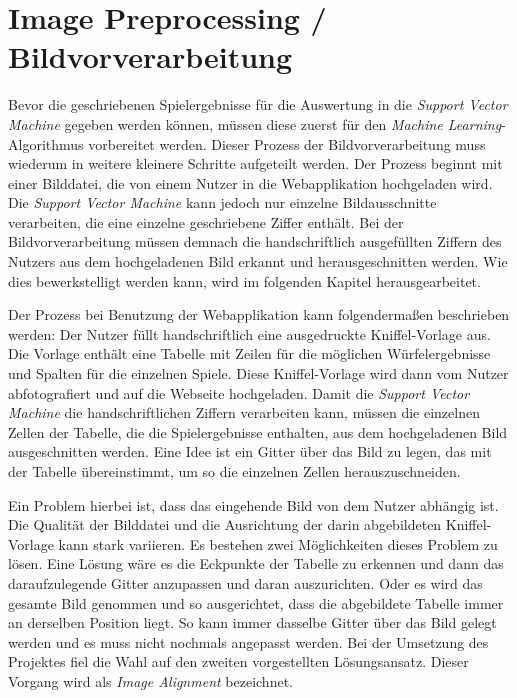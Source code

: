 \section{Image Preprocessing / Bildvorverarbeitung} \label{sec:imagepreprocessing}
Bevor die geschriebenen Spielergebnisse für die Auswertung in die \textit{Support Vector Machine} gegeben werden können, müssen diese zuerst
für den \textit{Machine Learning}-Algorithmus vorbereitet werden. Dieser Prozess der Bildvorverarbeitung muss wiederum in weitere kleinere
Schritte aufgeteilt werden. Der Prozess beginnt mit einer Bilddatei, die von einem Nutzer in die Webapplikation hochgeladen wird. 
Die \textit{Support Vector Machine} kann jedoch nur einzelne Bildausschnitte verarbeiten, die eine einzelne geschriebene Ziffer enthält.
Bei der Bildvorverarbeitung müssen demnach die handschriftlich ausgefüllten Ziffern des Nutzers aus dem hochgeladenen Bild erkannt und
herausgeschnitten werden. Wie dies bewerkstelligt werden kann, wird im folgenden Kapitel herausgearbeitet.

Der Prozess bei Benutzung der Webapplikation kann folgendermaßen beschrieben werden: Der Nutzer füllt handschriftlich eine ausgedruckte Kniffel-Vorlage aus.
Die Vorlage enthält eine Tabelle mit Zeilen für die möglichen Würfelergebnisse und Spalten für die einzelnen Spiele. Diese Kniffel-Vorlage 
wird dann vom Nutzer abfotografiert und auf die Webseite hochgeladen. Damit die \textit{Support Vector Machine} die handschriftlichen Ziffern verarbeiten kann,
müssen die einzelnen Zellen der Tabelle, die die Spielergebnisse enthalten, aus dem hochgeladenen Bild ausgeschnitten werden. Eine Idee ist
ein Gitter über das Bild zu legen, das mit der Tabelle übereinstimmt, um so die einzelnen Zellen herauszuschneiden.

Ein Problem hierbei ist, dass das eingehende Bild von dem Nutzer abhängig ist. Die Qualität der Bilddatei und die Ausrichtung der darin abgebildeten 
Kniffel-Vorlage kann stark variieren. Es bestehen zwei Möglichkeiten dieses Problem zu lösen. Eine Lösung wäre es die Eckpunkte der Tabelle zu erkennen und 
dann das daraufzulegende Gitter anzupassen und daran auszurichten. Oder es wird das gesamte Bild genommen und so ausgerichtet, dass die abgebildete Tabelle
immer an derselben Position liegt. So kann immer dasselbe Gitter über das Bild gelegt werden und es muss nicht nochmals angepasst werden.
Bei der Umsetzung des Projektes fiel die Wahl auf den zweiten vorgestellten Lösungsansatz. Dieser Vorgang wird als \textit{Image Alignment} bezeichnet.

